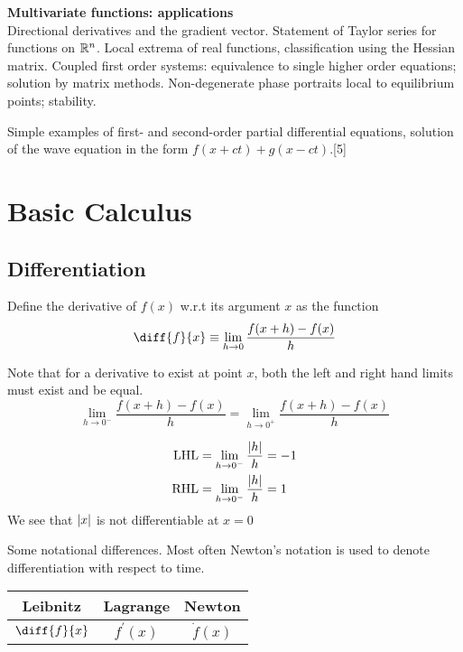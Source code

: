 \documentclass{article}
\begin{document}
{    \vspace{10pt}
    \noindent\textbf{Multivariate functions: applications}\\
    Directional derivatives and the gradient vector. Statement of Taylor series for functions on $\mathbb{R}^n$. Local extrema of real functions, classification using the Hessian matrix. Coupled first order systems: equivalence to single higher order equations; solution by matrix methods. Non-degenerate phase portraits local to equilibrium points; stability.
    
    \vspace{5pt}
    \noindent Simple examples of first- and second-order partial differential equations, solution of the wave equation in the form $f(x + ct) + g(x - ct)$.\hspace*{\fill}[5]}

\tableofcontents

\section{Basic Calculus}
\subsection{Differentiation}
\begin{defi}
    Define the derivative of $f(x)$ w.r.t its argument $x$ as the function
    \[
        \diff{f}{x} \equiv \lim_{h \rightarrow 0}{\frac{f(x +h) - f(x)}{h}}
    \]


    Note that for a derivative to exist at point $x$, both the left and right hand limits must exist and be equal. 
    \[
        \lim_{h \rightarrow 0^-}{\frac{f(x +h) - f(x)}{h}} = \lim_{h \rightarrow 0^+}{\frac{f(x +h) - f(x)}{h}}
    \]
\end{defi}

\begin{eg}[$f(x) = \abs{x}$]
    \begin{align*}
        \text{LHL} &= \lim_{h \rightarrow 0^-}{\frac{\left\lvert h\right\rvert}{h}} = -1 \\
        \text{RHL} &= \lim_{h \rightarrow 0^-}{\frac{\left\lvert h\right\rvert}{h}} = 1
    \end{align*}
    We see that $\left\lvert x\right\rvert$ is not differentiable at $x=0$
\end{eg}

Some notational differences. Most often Newton's notation is used to denote differentiation with respect to time. 
\begin{center}
    \begin{tabular}{ c|c|c }    
        Leibnitz & Lagrange & Newton \\
        \midrule
        $\diff{f}{x}$ & $f^{\prime}(x)$ & $\dot{f}(x)$
    \end{tabular}
\end{center}
\end{document}
